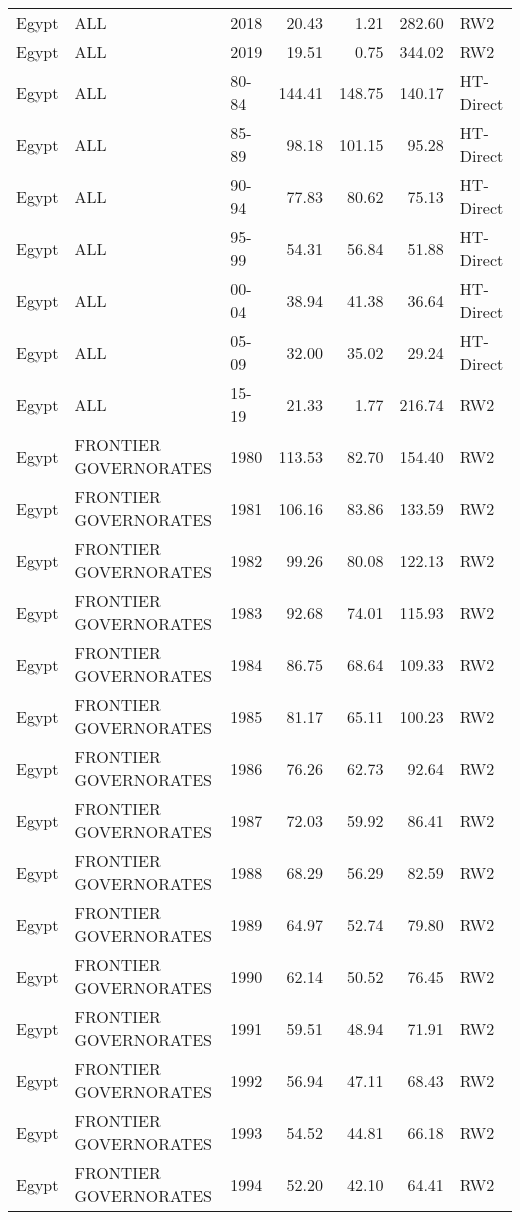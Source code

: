 \begin{longtable}{lllrrrl}
  Egypt & ALL & 2018 & 20.43 & 1.21 & 282.60 & RW2 \\ 
  Egypt & ALL & 2019 & 19.51 & 0.75 & 344.02 & RW2 \\ 
  Egypt & ALL & 80-84 & 144.41 & 148.75 & 140.17 & HT-Direct \\ 
  Egypt & ALL & 85-89 & 98.18 & 101.15 & 95.28 & HT-Direct \\ 
  Egypt & ALL & 90-94 & 77.83 & 80.62 & 75.13 & HT-Direct \\ 
  Egypt & ALL & 95-99 & 54.31 & 56.84 & 51.88 & HT-Direct \\ 
  Egypt & ALL & 00-04 & 38.94 & 41.38 & 36.64 & HT-Direct \\ 
  Egypt & ALL & 05-09 & 32.00 & 35.02 & 29.24 & HT-Direct \\ 
  Egypt & ALL & 15-19 & 21.33 & 1.77 & 216.74 & RW2 \\ 
  Egypt & FRONTIER GOVERNORATES & 1980 & 113.53 & 82.70 & 154.40 & RW2 \\ 
  Egypt & FRONTIER GOVERNORATES & 1981 & 106.16 & 83.86 & 133.59 & RW2 \\ 
  Egypt & FRONTIER GOVERNORATES & 1982 & 99.26 & 80.08 & 122.13 & RW2 \\ 
  Egypt & FRONTIER GOVERNORATES & 1983 & 92.68 & 74.01 & 115.93 & RW2 \\ 
  Egypt & FRONTIER GOVERNORATES & 1984 & 86.75 & 68.64 & 109.33 & RW2 \\ 
  Egypt & FRONTIER GOVERNORATES & 1985 & 81.17 & 65.11 & 100.23 & RW2 \\ 
  Egypt & FRONTIER GOVERNORATES & 1986 & 76.26 & 62.73 & 92.64 & RW2 \\ 
  Egypt & FRONTIER GOVERNORATES & 1987 & 72.03 & 59.92 & 86.41 & RW2 \\ 
  Egypt & FRONTIER GOVERNORATES & 1988 & 68.29 & 56.29 & 82.59 & RW2 \\ 
  Egypt & FRONTIER GOVERNORATES & 1989 & 64.97 & 52.74 & 79.80 & RW2 \\ 
  Egypt & FRONTIER GOVERNORATES & 1990 & 62.14 & 50.52 & 76.45 & RW2 \\ 
  Egypt & FRONTIER GOVERNORATES & 1991 & 59.51 & 48.94 & 71.91 & RW2 \\ 
  Egypt & FRONTIER GOVERNORATES & 1992 & 56.94 & 47.11 & 68.43 & RW2 \\ 
  Egypt & FRONTIER GOVERNORATES & 1993 & 54.52 & 44.81 & 66.18 & RW2 \\ 
  Egypt & FRONTIER GOVERNORATES & 1994 & 52.20 & 42.10 & 64.41 & RW2 \\ 

\end{longtable}
